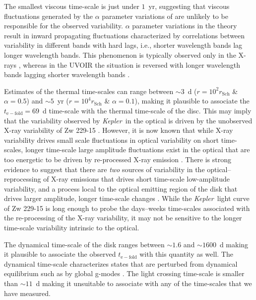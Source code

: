 \documentclass[a4paper,fleqn,usenatbib]{mnras}
\newcommand{\Kepler}{\textit{Kepler~}}
\begin{document}
The smallest viscous time-scale is just under $1$~yr, suggesting that viscous fluctuations generated by the $\alpha$ parameter variations of \citet{Lyubarskii97} are unlikely to be responsible for the observed variability. $\alpha$ parameter variations in the \citet{Lyubarskii97} theory result in inward propagating fluctuations characterized by correlations between variability in different bands with hard lags, i.e., shorter wavelength bands lag longer wavelength bands. This phenomenon is typically observed only in the X-rays \citep{Vaughan04,McHardy04b,Arevalo06}, whereas in the UVOIR the situation is reversed with longer wavelength bands lagging shorter wavelength bands \citep{Wanders97,Sergeev05}. 

Estimates of the thermal time-scales can range between $\sim 3$~d ($r = 10^{2} r_{\mathrm{Sch}}$ \& $\alpha = 0.5$) and $\sim 5$~yr ($r = 10^{4} r_{\mathrm{Sch}}$ \& $\alpha = 0.1$), making it plausible to associate the $t_{\mathrm{e-fold}} = 69$~d time-scale with the thermal time-scale of the disc. This may imply that the variability observed by \Kepler in the optical is driven by the unobserved X-ray variability of Zw 229-15 \citep{Krolik91}. However, it is now known that while X-ray variability drives small scale fluctuations in optical variability on short time-scales, longer time-scale large amplitude fluctuations exist in the optical that are too energetic to be driven by re-processed X-ray emission \citep{Uttley03,Arevalo09}. There is strong evidence to suggest that there are \textit{two} sources of variability in the optical--reprocessing of X-ray emissions that drives short time-scale low-amplitude variability, and a process local to the optical emitting region of the disk that drives larger amplitude, longer time-scale changes \citep{Gaskell08}. While the \Kepler light curve of Zw 229-15 is long enough to probe the days--weeks time-scales associated with the re-processing of the X-ray variability, it may not be sensitive to the longer time-scale variability intrinsic to the optical.

The dynamical time-scale of the disk ranges between $\sim 1.6$ and $\sim 1600$~d making it plausible to associate the observed $t_{\mathrm{e-fold}}$ with this quantity as well. The dynamical time-scale characterizes states that are perturbed from dynamical equilibrium such as by global g-modes \citep{ReynoldsMiller09a,ReynoldsMiller09b}. The light crossing time-scale is smaller than $\sim 11$~d making it unsuitable to associate with any of the time-scales that we have measured.  
\end{document}
